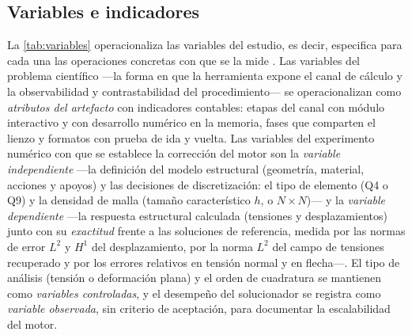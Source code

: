 \subsection{Variables e indicadores}
\label{sec:variables-met}

La \autoref{tab:variables} operacionaliza las variables del estudio, es decir, especifica para cada una las operaciones concretas con que se la mide \autocite[p.~137]{sampieri2018metodologia}. Las variables del problema científico —la forma en que la herramienta expone el canal de cálculo y la observabilidad y contrastabilidad del procedimiento— se operacionalizan como \emph{atributos del artefacto} con indicadores contables: etapas del canal con módulo interactivo y con desarrollo numérico en la memoria, fases que comparten el lienzo y formatos con prueba de ida y vuelta. Las variables del experimento numérico con que se establece la corrección del motor son la \emph{variable independiente} —la definición del modelo estructural (geometría, material, acciones y apoyos) y las decisiones de discretización: el tipo de elemento (Q4 o Q9) y la densidad de malla (tamaño característico $h$, o $N\times N$)— y la \emph{variable dependiente} —la respuesta estructural calculada (tensiones y desplazamientos) junto con su \emph{exactitud} frente a las soluciones de referencia, medida por las normas de error $L^2$ y $H^1$ del desplazamiento, por la norma $L^2$ del campo de tensiones recuperado y por los errores relativos en tensión normal y en flecha—. El tipo de análisis (tensión o deformación plana) y el orden de cuadratura se mantienen como \emph{variables controladas}, y el desempeño del solucionador se registra como \emph{variable observada}, sin criterio de aceptación, para documentar la escalabilidad del motor.

